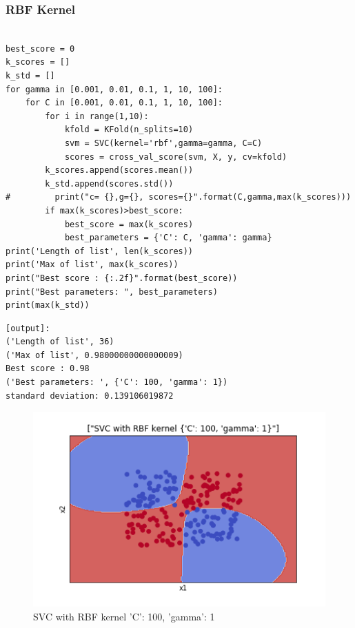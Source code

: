 \documentclass[10pt,a4paper]{article}
\begin{document}
\subsubsection{RBF Kernel}

\lstset{%
basicstyle=\small, %
identifierstyle=, %
stringstyle=\ttfamily, %
showstringspaces=false} %

\lstset{language=Python}          %

\begin{lstlisting}[label=loaddata,caption=Importing the data]  % Start your code-block

best_score = 0
k_scores = []
k_std = []
for gamma in [0.001, 0.01, 0.1, 1, 10, 100]:
    for C in [0.001, 0.01, 0.1, 1, 10, 100]:        
        for i in range(1,10):               
            kfold = KFold(n_splits=10)
            svm = SVC(kernel='rbf',gamma=gamma, C=C)
            scores = cross_val_score(svm, X, y, cv=kfold)
        k_scores.append(scores.mean())
        k_std.append(scores.std())
#         print("c= {},g={}, scores={}".format(C,gamma,max(k_scores)))
        if max(k_scores)>best_score:
            best_score = max(k_scores)
            best_parameters = {'C': C, 'gamma': gamma}
print('Length of list', len(k_scores))
print('Max of list', max(k_scores))
print("Best score : {:.2f}".format(best_score))
print("Best parameters: ", best_parameters)
print(max(k_std))

\end{lstlisting}

\begin{verbatim}
[output]:
('Length of list', 36)
('Max of list', 0.98000000000000009)
Best score : 0.98
('Best parameters: ', {'C': 100, 'gamma': 1})
standard deviation: 0.139106019872
\end{verbatim}

\graphicspath{ {/images/} }
\begin{figure}[!h]
\includegraphics[scale=0.75]{images/P2/RBFg1c100.png}
  \caption{SVC with RBF kernel {'C': 100, 'gamma': 1}}
  \label{fig:rbf_ker}
\end{figure}
\clearpage%
\end{document}
